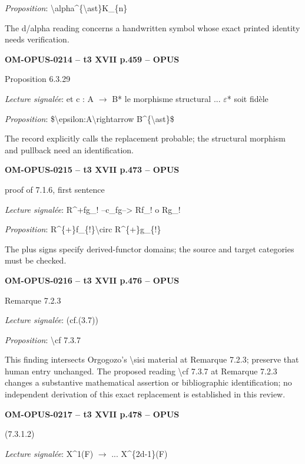 \emph{Proposition}: \textbackslash{}alpha\textasciicircum{}\{\textbackslash{}ast\}K\_\{n\}\par
The d/alpha reading concerns a handwritten symbol whose exact printed identity needs verification.\par
\par\noindent\textbf{OM-OPUS-0214 -- t3 XVII p.459 -- OPUS}\par
Proposition 6.3.29\par
\emph{Lecture signalée}: et c : A \ensuremath{\to} B* le morphisme structural ... \ensuremath{\varepsilon}* soit fidèle\par
\emph{Proposition}: \$\textbackslash{}epsilon:A\textbackslash{}rightarrow B\textasciicircum{}\{\textbackslash{}ast\}\$\par
The record explicitly calls the replacement probable; the structural morphism and pullback need an identification.\par
\par\noindent\textbf{OM-OPUS-0215 -- t3 XVII p.473 -- OPUS}\par
proof of 7.1.6, first sentence\par
\emph{Lecture signalée}: R\textasciicircum{}+fg\_! --c\_fg--> Rf\_! o Rg\_!\par
\emph{Proposition}: R\textasciicircum{}\{+\}f\_\{!\}\textbackslash{}circ R\textasciicircum{}\{+\}g\_\{!\}\par
The plus signs specify derived-functor domains; the source and target categories must be checked.\par
\par\noindent\textbf{OM-OPUS-0216 -- t3 XVII p.476 -- OPUS}\par
Remarque 7.2.3\par
\emph{Lecture signalée}: (cf.(3.7))\par
\emph{Proposition}: \textbackslash{}cf 7.3.7\par
This finding intersects Orgogozo's \textbackslash{}sisi material at Remarque 7.2.3; preserve that human entry unchanged. The proposed reading \textbackslash{}cf 7.3.7 at Remarque 7.2.3 changes a substantive mathematical assertion or bibliographic identification; no independent derivation of this exact replacement is established in this review.\par
\par\noindent\textbf{OM-OPUS-0217 -- t3 XVII p.478 -- OPUS}\par
(7.3.1.2)\par
\emph{Lecture signalée}: X\textasciicircum{}1(F) \ensuremath{\to} ... X\textasciicircum{}\{2d-1\}(F)\par
